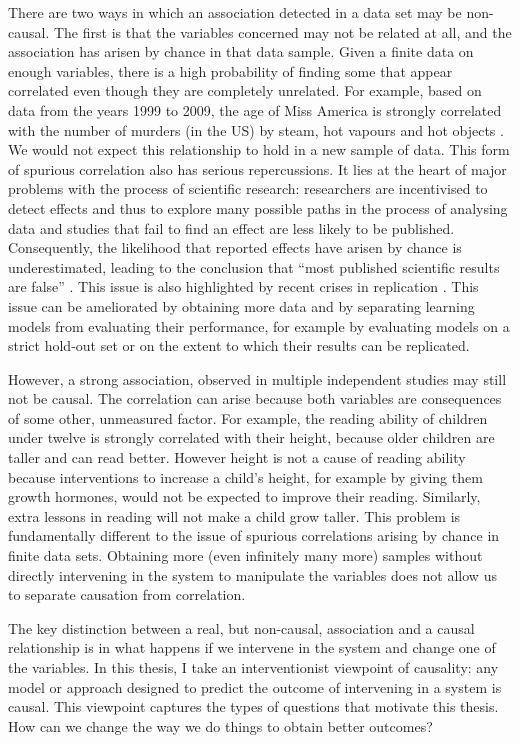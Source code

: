 \documentclass[11pt,a4paper,twoside]{report}
\newcommand{\quotes}[1]{``#1''}
\theoremstyle{plain}
\theoremstyle{definition}
\begin{document}
There are two ways in which an association detected in a data set may be non-causal. The first is that the variables concerned may not be related at all, and the association has arisen by chance in that data sample. Given a finite data on enough variables, there is a high probability of finding some that appear correlated even though they are completely unrelated. For example, based on data from the years 1999 to 2009, the age of Miss America is strongly correlated with the number of murders  (in the US) by steam, hot vapours and hot objects \citep{Vigen2015}. We would not expect this relationship to hold in a new sample of data. This form of spurious correlation also has serious repercussions. It lies at the heart of major problems with the process of scientific research: researchers are incentivised to detect effects and thus to explore many possible paths in the process of analysing data and studies that fail to find an effect are less likely to be published. Consequently, the likelihood that reported effects have arisen by chance is underestimated, leading to the conclusion that \quotes{most published scientific results are false} \citep{Ioannidis2005}. This issue is also highlighted by recent crises in replication \citep{OpenScienceCollaboration2015}. This issue can be ameliorated by obtaining more data and by separating learning models from evaluating their performance, for example by evaluating models on a strict hold-out set or on the extent to which their results can be replicated. 

However, a strong association, observed in multiple independent studies may still not be causal. The correlation can arise because both variables are consequences of some other, unmeasured factor. For example, the reading ability of children under twelve is strongly correlated with their height, because older children are taller and can read better. However height is not a cause of reading ability because interventions to increase a child's height, for example by giving them growth hormones, would not be expected to improve their reading. Similarly, extra lessons in reading will not make a child grow taller. This problem is fundamentally different to the issue of spurious correlations arising by chance in finite data sets. Obtaining more (even infinitely many more) samples without directly intervening in the system to manipulate the variables does not allow us to separate causation from correlation. 

The key distinction between a real, but non-causal, association and a causal relationship is in what happens if we intervene in the system and change one of the variables. In this thesis, I take an interventionist viewpoint of causality: any model or approach designed to predict the outcome of intervening in a system is causal. This viewpoint captures the types of questions that motivate this thesis. How can we change the way we do things to obtain better outcomes? 
\end{document}
